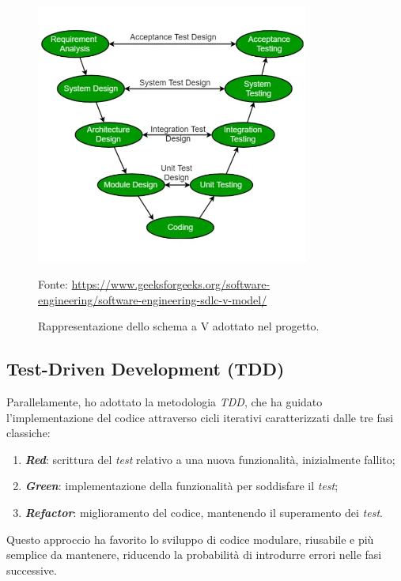 \begin{figure}[H]
    \begin{center}
    \includegraphics[width=0.8\textwidth]{img/V-model.png}
    \caption{Rappresentazione dello schema a V adottato nel progetto.}
    Fonte: \url{https://www.geeksforgeeks.org/software-engineering/software-engineering-sdlc-v-model/}
    \label{fig:schema-v}
    \end{center}
\end{figure}

\subsection*{Test-Driven Development (TDD)}
Parallelamente, ho adottato la metodologia \textit{TDD}, che ha guidato l'implementazione del codice attraverso cicli iterativi caratterizzati dalle tre fasi classiche:
\begin{enumerate}
    \item \textit{\textbf{Red}}: scrittura del \textit{test} relativo a una nuova funzionalità, inizialmente fallito;
    \item \textit{\textbf{Green}}: implementazione della funzionalità per soddisfare il \textit{test};
    \item \textit{\textbf{Refactor}}: miglioramento del codice, mantenendo il superamento dei \textit{test}.
\end{enumerate}
Questo approccio ha favorito lo sviluppo di codice modulare, riusabile e più semplice da mantenere, riducendo la probabilità di introdurre errori nelle fasi successive.  

